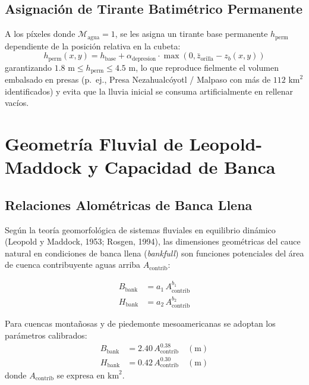 \documentclass[11pt,a4paper]{article}
\begin{document}
\subsection{Asignación de Tirante Batimétrico Permanente}

A los píxeles donde $\mathcal{M}_{\text{agua}} = 1$, se les asigna un tirante base permanente $h_{\text{perm}}$ dependiente de la posición relativa en la cubeta:
\begin{equation}
  h_{\text{perm}}(x,y) = h_{\text{base}} + \alpha_{\text{depresion}} \cdot \max\left(0, \bar{z}_{\text{orilla}} - z_b(x,y)\right)
\end{equation}
garantizando $1.8\text{ m} \le h_{\text{perm}} \le 4.5\text{ m}$, lo que reproduce fielmente el volumen embalsado en presas (p.~ej., Presa Nezahualcóyotl / Malpaso con más de $112\text{ km}^2$ identificados) y evita que la lluvia inicial se consuma artificialmente en rellenar vacíos.

\section{Geometría Fluvial de Leopold-Maddock y Capacidad de Banca}

\subsection{Relaciones Alométricas de Banca Llena}

Según la teoría geomorfológica de sistemas fluviales en equilibrio dinámico (Leopold y Maddock, 1953; Rosgen, 1994), las dimensiones geométricas del cauce natural en condiciones de banca llena (\emph{bankfull}) son funciones potenciales del área de cuenca contribuyente aguas arriba $A_{\text{contrib}}$:

\begin{align}
  B_{\text{bank}} &= a_1 \, A_{\text{contrib}}^{b_1} \\
  H_{\text{bank}} &= a_2 \, A_{\text{contrib}}^{b_2}
\end{align}

Para cuencas montañosas y de piedemonte mesoamericanas se adoptan los parámetros calibrados:
\begin{align}
  B_{\text{bank}} &= 2.40 \, A_{\text{contrib}}^{0.38} \quad (\text{m}) \\
  H_{\text{bank}} &= 0.42 \, A_{\text{contrib}}^{0.30} \quad (\text{m})
\end{align}
donde $A_{\text{contrib}}$ se expresa en $\text{km}^2$.
\end{document}
